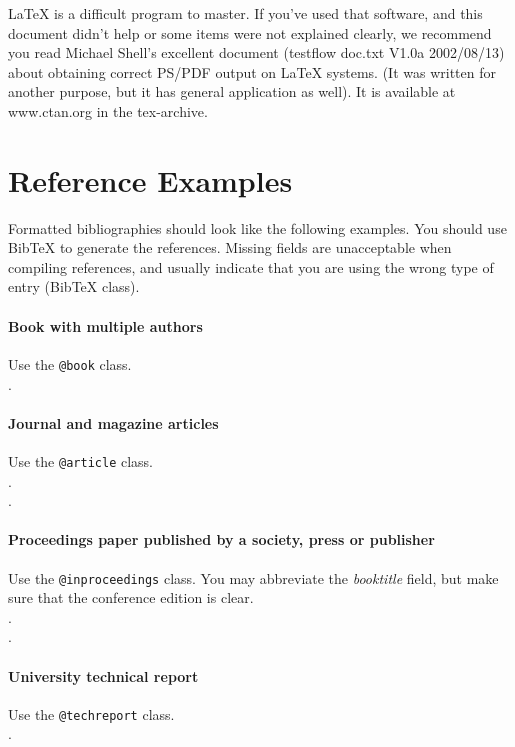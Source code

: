 \LaTeX{} is a difficult program to master. If you've used that software,
and this document didn't help or some items were not explained clearly,
we recommend you read Michael Shell's excellent document (testflow
doc.txt V1.0a 2002/08/13) about obtaining correct PS/PDF output on
\LaTeX{} systems. (It was written for another purpose, but it has
general application as well). It is available at www.ctan.org in the
tex-archive.

\appendix
\section{Reference Examples}
\label{sec:reference_examples}

\nobibliography*Formatted bibliographies should look like the following
examples. You should use BibTeX to generate the references. Missing
fields are unacceptable when compiling references, and usually indicate
that you are using the wrong type of entry (BibTeX class).

\paragraph{Book with multiple authors~\nocite{em:86}} Use the \texttt{@book} class.\\[.2em]
.

\paragraph{Journal and magazine articles~\nocite{r:80, hcr:83}} Use the \texttt{@article} class.\\[.2em]
.\\[.2em]
.

\paragraph{Proceedings paper published by a society, press or publisher~\nocite{c:83, c:84}} Use the \texttt{@inproceedings} class. You may abbreviate the \emph{booktitle} field, but make sure that the conference edition is clear.\\[.2em]
.\\[.2em]
.

\paragraph{University technical report~\nocite{r:86}} Use the \texttt{@techreport} class.\\[.2em]
.

